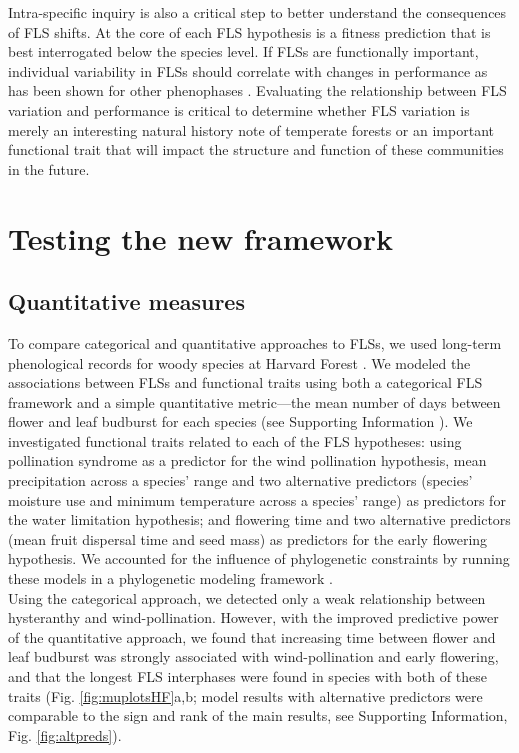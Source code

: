 \documentclass[11pt]{article}
\begin{document}
\noindent Intra-specific inquiry is also a critical step to better understand the consequences of FLS shifts. At the core of each FLS hypothesis is a fitness prediction that is best interrogated below the species level. If FLSs are functionally important, individual variability in FLSs should correlate with changes in performance as has been shown for other phenophases \citep[e.g.][]{Schermer2020}. Evaluating the relationship between FLS variation and performance is critical to determine whether FLS variation is merely an interesting natural history note of temperate forests or an important functional trait that will impact the structure and function of these communities in the future.\\ 

\section*{Testing the new framework}
\subsection*{Quantitative measures}
\noindent To compare categorical and quantitative approaches to FLSs, we used long-term phenological records for woody species at Harvard Forest \citep{OKeefe2015}. We modeled the associations between FLSs and functional traits using both a categorical FLS framework and a simple quantitative metric---the mean number of days between flower and leaf budburst for each species (see Supporting Information ). We investigated functional traits related to each of the FLS hypotheses: using pollination syndrome as a predictor for the wind pollination hypothesis, mean precipitation across a species' range and two alternative predictors (species' moisture use and minimum temperature across a species' range) as predictors for the water limitation hypothesis; and flowering time and two alternative predictors (mean fruit dispersal time and seed mass) as predictors for the early flowering hypothesis. We accounted for the influence of phylogenetic constraints by running these models in a phylogenetic modeling framework \citep{Ives2010}.\\ %

\noindent Using the categorical approach, we detected only a weak relationship between hysteranthy and wind-pollination. However, with the improved predictive power of the quantitative approach, we found that increasing time between flower and leaf budburst was strongly associated with wind-pollination and early flowering, and that the longest FLS interphases were found in species with both of these traits (Fig. \ref{fig:muplotsHF}a,b; model results with alternative predictors were comparable to the sign and rank of the main results, see Supporting Information, Fig. \ref{fig:altpreds}).\\  %
\end{document}
